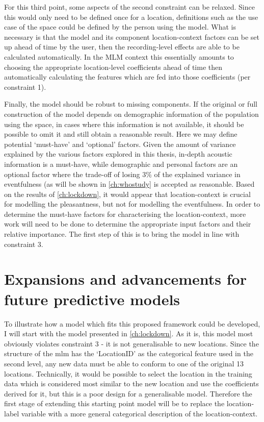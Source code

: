 For this third point, some aspects of the second constraint can be relaxed. Since this would only need to be defined once for a location, definitions such as the use case of the space could be defined by the person using the model. What is necessary is that the model and its component location-context factors can be set up ahead of time by the user, then the recording-level effects are able to be calculated automatically. In the MLM context this essentially amounts to choosing the appropriate location-level coefficients ahead of time then automatically calculating the features which are fed into those coefficients (per constraint 1).

Finally, the model should be robust to missing components. If the original or full construction of the model depends on demographic information of the population using the space, in cases where this information is not available, it should be possible to omit it and still obtain a reasonable result. Here we may define potential `must-have’ and `optional’ factors. Given the amount of variance explained by the various factors explored in this thesis, in-depth acoustic information is a must-have, while demographic and personal factors are an optional factor where the trade-off of losing 3\% of the explained variance in eventfulness (as will be shown in \cref{ch:whostudy} is accepted as reasonable. Based on the results of \cref{ch:lockdown}, it would appear that location-context is crucial for modelling the pleasantness, but not for modelling the eventfulness. In order to determine the must-have factors for characterising the location-context, more work will need to be done to determine the appropriate input factors and their relative importance. The first step of this is to bring the model in line with constraint 3.

\section{Expansions and advancements for future predictive models}

To illustrate how a model which fits this proposed framework could be developed, I will start with the model presented in \cref{ch:lockdown}. As it is, this model most obviously violates constraint 3 - it is not generalisable to new locations. Since the structure of the \gls{mlm} has the `LocationID' as the categorical feature used in the second level, any new data must be able to conform to one of the original 13 locations. Technically, it would be possible to select the location in the training data which is considered most similar to the new location and use the coefficients derived for it, but this is a poor design for a generalisable model. Therefore the first stage of extending this starting point model will be to replace the location-label variable with a more general categorical description of the location-context.

